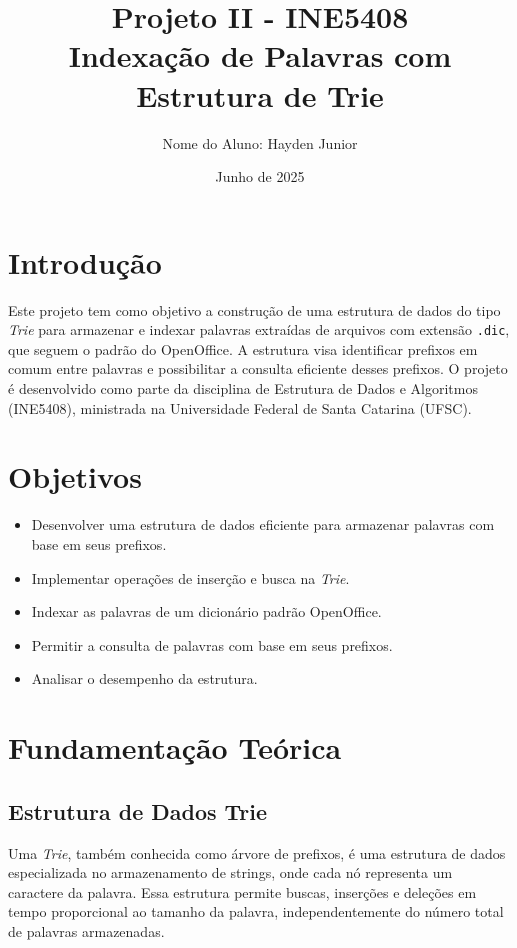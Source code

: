 \documentclass[12pt]{article}
\title{Projeto II - INE5408\\Indexação de Palavras com Estrutura de Trie}
\author{Nome do Aluno: Hayden Junior}
\date{Junho de 2025}
\begin{document}
\maketitle

\tableofcontents
\newpage

\section{Introdução}

Este projeto tem como objetivo a construção de uma estrutura de dados do tipo \textit{Trie} para armazenar e indexar palavras extraídas de arquivos com extensão \texttt{.dic}, que seguem o padrão do OpenOffice. A estrutura visa identificar prefixos em comum entre palavras e possibilitar a consulta eficiente desses prefixos. O projeto é desenvolvido como parte da disciplina de Estrutura de Dados e Algoritmos (INE5408), ministrada na Universidade Federal de Santa Catarina (UFSC).

\section{Objetivos}

\begin{itemize}
    \item Desenvolver uma estrutura de dados eficiente para armazenar palavras com base em seus prefixos.
    \item Implementar operações de inserção e busca na \textit{Trie}.
    \item Indexar as palavras de um dicionário padrão OpenOffice.
    \item Permitir a consulta de palavras com base em seus prefixos.
    \item Analisar o desempenho da estrutura.
\end{itemize}

\section{Fundamentação Teórica}

\subsection{Estrutura de Dados Trie}

Uma \textit{Trie}, também conhecida como árvore de prefixos, é uma estrutura de dados especializada no armazenamento de strings, onde cada nó representa um caractere da palavra. Essa estrutura permite buscas, inserções e deleções em tempo proporcional ao tamanho da palavra, independentemente do número total de palavras armazenadas.
\end{document}
